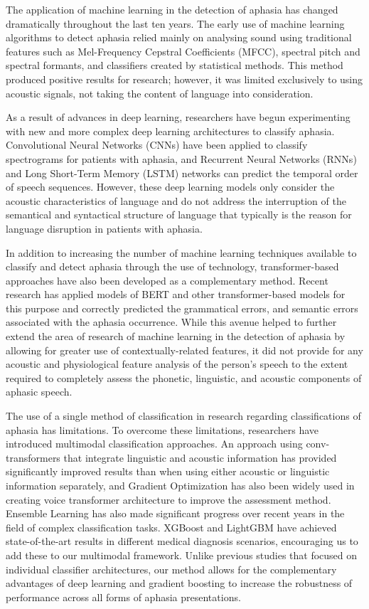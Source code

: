 \documentclass[conference]{IEEEtran}
\begin{document}
The application of machine learning in the detection of aphasia has changed dramatically throughout the last ten years. The early use of machine learning algorithms to detect aphasia relied mainly on analysing sound using traditional features such as Mel-Frequency Cepstral Coefficients (MFCC), spectral pitch and spectral formants, and classifiers created by statistical methods. This method produced positive results for research; however, it was limited exclusively to using acoustic signals, not taking the content of language into consideration.

As a result of advances in deep learning, researchers have begun experimenting with new and more complex deep learning architectures to classify aphasia\cite{rajendran2024conv}. Convolutional Neural Networks (CNNs) have been applied to classify spectrograms for patients with aphasia, and Recurrent Neural Networks (RNNs) and Long Short-Term Memory (LSTM) networks can predict the temporal order of speech sequences\cite{hochreiter1997lstm}. However, these deep learning models only consider the acoustic characteristics of language and do not address the interruption of the semantical and syntactical structure of language that typically is the reason for language disruption in patients with aphasia.

In addition to increasing the number of machine learning techniques available to classify and detect aphasia through the use of technology, transformer-based approaches have also been developed as a complementary method. Recent research has applied models of BERT and other transformer-based models for this purpose and correctly predicted the grammatical errors, and semantic errors associated with the aphasia occurrence\cite{devlin2019}. While this avenue helped to further extend the area of research of machine learning in the detection of aphasia by allowing for greater use of contextually-related features, it did not provide for any acoustic and physiological feature analysis of the person's speech to the extent required to completely assess the phonetic, linguistic, and acoustic components of aphasic speech.

The use of a single method of classification in research regarding classifications of aphasia has limitations. To overcome these limitations, researchers have introduced multimodal classification approaches. An approach using conv-transformers that integrate linguistic and acoustic information has provided significantly improved results than when using either acoustic or linguistic information separately\cite{rajendran2024conv}, and Gradient Optimization has also been widely used in creating voice transformer architecture to improve the assessment method\cite{ranjith2024gtso}. Ensemble Learning has also made significant progress over recent years in the field of complex classification tasks. XGBoost and LightGBM have achieved state-of-the-art results in different medical diagnosis scenarios\cite{chen2016xgboost,ke2017lightgbm}, encouraging us to add these to our multimodal framework. Unlike previous studies that focused on individual classifier architectures, our method allows for the complementary advantages of deep learning and gradient boosting to increase the robustness of performance across all forms of aphasia presentations.
\end{document}
